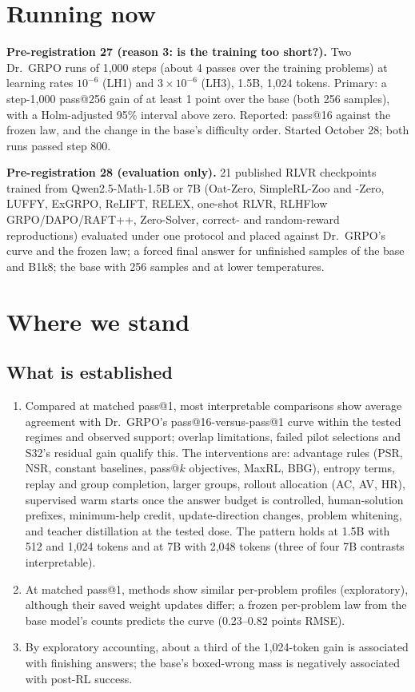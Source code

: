 \documentclass[11pt]{article}
\begin{document}
\section{Running now}
\textbf{Pre-registration 27 (reason 3: is the training too short?).} Two Dr.\ GRPO runs of 1,000 steps (about 4 passes over the training problems) at learning rates $10^{-6}$ (LH1) and $3\times10^{-6}$ (LH3), 1.5B, 1,024 tokens. Primary: a step-1,000 pass@256 gain of at least 1 point over the base (both 256 samples), with a Holm-adjusted 95\% interval above zero. Reported: pass@16 against the frozen law, and the change in the base's difficulty order. Started October 28; both runs passed step 800.

\textbf{Pre-registration 28 (evaluation only).} 21 published RLVR checkpoints trained from Qwen2.5-Math-1.5B or 7B (Oat-Zero, SimpleRL-Zoo and -Zero, LUFFY, ExGRPO, ReLIFT, RELEX, one-shot RLVR, RLHFlow GRPO/DAPO/RAFT++, Zero-Solver, correct- and random-reward reproductions) evaluated under one protocol and placed against Dr.\ GRPO's curve and the frozen law; a forced final answer for unfinished samples of the base and B1k8; the base with 256 samples and at lower temperatures.

\section{Where we stand}
\subsection{What is established}
\begin{enumerate}[leftmargin=*,itemsep=1pt]
\item Compared at matched pass@1, most interpretable comparisons show average agreement with Dr.\ GRPO's pass@16-versus-pass@1 curve within the tested regimes and observed support; overlap limitations, failed pilot selections and S32's residual gain qualify this. The interventions are: advantage rules (PSR, NSR, constant baselines, pass@$k$ objectives, MaxRL, BBG), entropy terms, replay and group completion, larger groups, rollout allocation (AC, AV, HR), supervised warm starts once the answer budget is controlled, human-solution prefixes, minimum-help credit, update-direction changes, problem whitening, and teacher distillation at the tested dose. The pattern holds at 1.5B with 512 and 1,024 tokens and at 7B with 2,048 tokens (three of four 7B contrasts interpretable).
\item At matched pass@1, methods show similar per-problem profiles (exploratory), although their saved weight updates differ; a frozen per-problem law from the base model's counts predicts the curve (0.23--0.82 points RMSE).
\item By exploratory accounting, about a third of the 1,024-token gain is associated with finishing answers; the base's boxed-wrong mass is negatively associated with post-RL success.
\end{enumerate}
\end{document}

